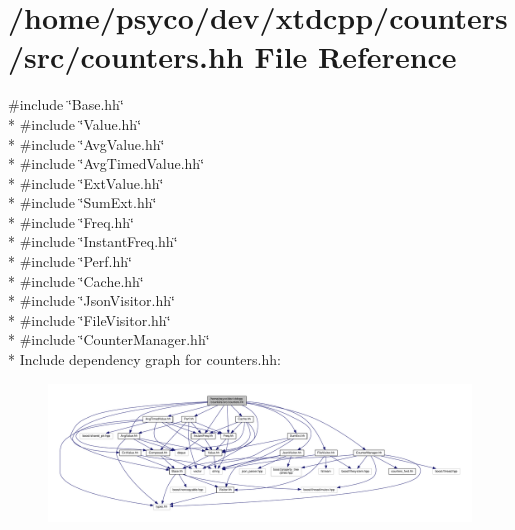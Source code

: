 \hypertarget{counters_8hh}{}\section{/home/psyco/dev/xtdcpp/counters/src/counters.hh File Reference}
\label{counters_8hh}
{\ttfamily \#include \char`\"{}Base.\+hh\char`\"{}}\\*
{\ttfamily \#include \char`\"{}Value.\+hh\char`\"{}}\\*
{\ttfamily \#include \char`\"{}Avg\+Value.\+hh\char`\"{}}\\*
{\ttfamily \#include \char`\"{}Avg\+Timed\+Value.\+hh\char`\"{}}\\*
{\ttfamily \#include \char`\"{}Ext\+Value.\+hh\char`\"{}}\\*
{\ttfamily \#include \char`\"{}Sum\+Ext.\+hh\char`\"{}}\\*
{\ttfamily \#include \char`\"{}Freq.\+hh\char`\"{}}\\*
{\ttfamily \#include \char`\"{}Instant\+Freq.\+hh\char`\"{}}\\*
{\ttfamily \#include \char`\"{}Perf.\+hh\char`\"{}}\\*
{\ttfamily \#include \char`\"{}Cache.\+hh\char`\"{}}\\*
{\ttfamily \#include \char`\"{}Json\+Visitor.\+hh\char`\"{}}\\*
{\ttfamily \#include \char`\"{}File\+Visitor.\+hh\char`\"{}}\\*
{\ttfamily \#include \char`\"{}Counter\+Manager.\+hh\char`\"{}}\\*
Include dependency graph for counters.\+hh\+:
\nopagebreak
\begin{figure}[H]
\begin{center}
\leavevmode
\includegraphics[width=350pt]{counters_8hh__incl}
\end{center}
\end{figure}
